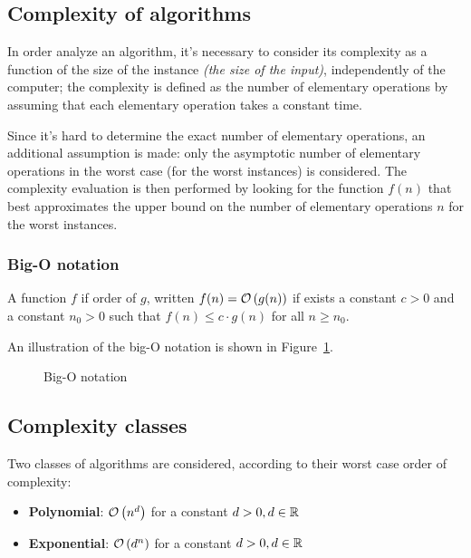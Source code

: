 \documentclass[english]{article}
\begin{document}
\subsection{Complexity of algorithms}

In order analyze an algorithm, it's necessary to consider its complexity as a function of the size of the instance \textit{(the size of the input)}, independently of the computer;
the complexity is defined as the number of elementary operations by assuming that each elementary operation takes a constant time.

Since it's hard to determine the exact number of elementary operations, an additional assumption is made: only the asymptotic number of elementary operations in the worst case (for the worst instances) is considered.
The complexity evaluation is then performed by looking for the function \(f(n)\) that best approximates the upper bound on the number of elementary operations \(n\) for the worst instances.

\subsubsection{Big-O notation}

A function \(f\) if order of \(g\), written \(f(n) = \mathcal{O}\left(g(n)\right)\) if exists a constant \(c > 0\) and a constant \(n_0 > 0\) such that \(f(n) \leq c \cdot g(n)\) for all \(n \geq n_0\).

An illustration of the big-O notation is shown in Figure~\ref{fig:big-o-notation}.

\begin{figure}[htbp]
  \bigskip
  \centering
  \caption{Big-O notation}
  \label{fig:big-o-notation}
  \bigskip
\end{figure}

\subsection{Complexity classes}

Two classes of algorithms are considered, according to their worst case order of complexity:

\begin{itemize}
  \item \textbf{Polynomial}: \(\mathcal{O}\left(n^d\right)\) for a constant \(d > 0, d \in \mathbb{R}\)
  \item \textbf{Exponential}: \(\mathcal{O}\left(d^n\right)\) for a constant \(d > 0, d \in \mathbb{R}\)
\end{itemize}
\end{document}
